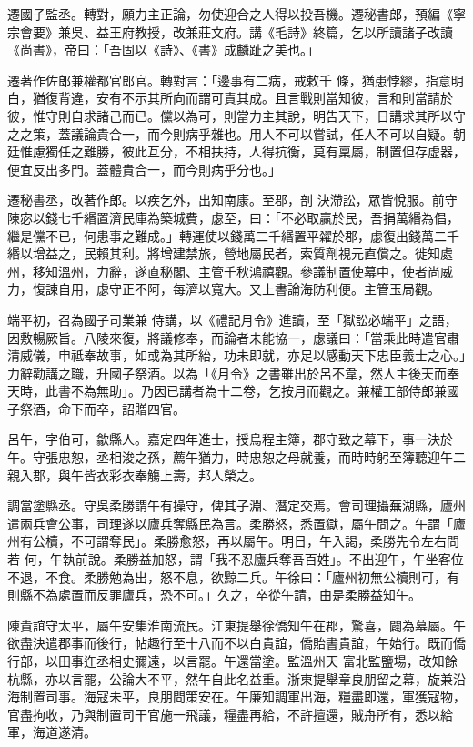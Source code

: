 \begin{pinyinscope}
 遷國子監丞。轉對，願力主正論，勿使迎合之人得以投吾機。遷秘書郎，預編《寧宗會要》兼吳、益王府教授，改兼莊文府。講《毛詩》終篇，乞以所讀諸子改讀《尚書》，帝曰：「吾固以《詩》、《書》成麟趾之美也。」



 遷著作佐郎兼權都官郎官。轉對言：「邊事有二病，戒敕千
 條，猶患悖繆，指意明白，猶復背違，安有不示其所向而謂可責其成。且言戰則當知彼，言和則當請於彼，惟守則自求諸己而已。儻以為可，則當力主其說，明告天下，日講求其所以守之之策，蓋議論貴合一，而今則病乎雜也。用人不可以嘗試，任人不可以自疑。朝廷惟慮獨任之難勝，彼此互分，不相扶持，人得抗衡，莫有稟屬，制置但存虛器，便宜反出多門。蓋體貴合一，而今則病乎分也。」



 遷秘書丞，改著作郎。以疾乞外，出知南康。至郡，剖
 決滯訟，眾皆悅服。前守陳宓以錢七千緡置濟民庫為築城費，虙至，曰：「不必取贏於民，吾捐萬緡為倡，繼是儻不已，何患事之難成。」轉運使以錢萬二千緡置平糴於郡，虙復出錢萬二千緡以增益之，民賴其利。將增建禁旅，營地屬民者，索質劑視元直償之。徙知處州，移知溫州，力辭，遂直秘閣、主管千秋鴻禧觀。參議制置使幕中，使者尚威力，愎諫自用，虙守正不阿，每濟以寬大。又上書論海防利便。主管玉局觀。



 端平初，召為國子司業兼
 侍講，以《禮記月令》進讀，至「獄訟必端平」之語，因敷暢厥旨。八陵來復，將議修奉，而論者未能協一，虙議曰：「當乘此時遣官肅清威儀，申祗奉故事，如或為其所紿，功未即就，亦足以感動天下忠臣義士之心。」力辭勸講之職，升國子祭酒。以為「《月令》之書雖出於呂不韋，然人主後天而奉天時，此書不為無助」。乃因已講者為十二卷，乞按月而觀之。兼權工部侍郎兼國子祭酒，命下而卒，詔贈四官。



 呂午，字伯可，歙縣人。嘉定四年進士，授烏程主簿，郡守致之幕下，事一決於午。守張忠恕，丞相浚之孫，薦午猶力，時忠恕之母就養，而時時躬至簿聽迎午二親入郡，與午皆衣彩衣奉觴上壽，邦人榮之。



 調當塗縣丞。守吳柔勝謂午有操守，俾其子淵、潛定交焉。會司理攝蕪湖縣，廬州遣兩兵會公事，司理遂以廬兵奪縣民為言。柔勝怒，悉置獄，屬午問之。午謂「廬州有公櫝，不可謂奪民」。柔勝愈怒，再以屬午。明日，午入謁，柔勝先令左右問若
 何，午執前說。柔勝益加怒，謂「我不忍廬兵奪吾百姓」。不出迎午，午坐客位不退，不食。柔勝勉為出，怒不息，欲黥二兵。午徐曰：「廬州初無公櫝則可，有則縣不為處置而反罪廬兵，恐不可。」久之，卒從午請，由是柔勝益知午。



 陳貴誼守太平，屬午安集淮南流民。江東提舉徐僑知午在郡，驚喜，闢為幕屬。午欲盡決遣郡事而後行，帖趣行至十八而不以白貴誼，僑貽書貴誼，午始行。既而僑行部，以田事迕丞相史彌遠，以言罷。午還當塗。監溫州天
 富北監鹽場，改知餘杭縣，亦以言罷，公論大不平，然午自此名益重。浙東提舉章良朋留之幕，旋兼沿海制置司事。海寇未平，良朋問策安在。午廉知調軍出海，糧盡即還，軍獲寇物，官盡拘收，乃與制置司干官施一飛議，糧盡再給，不許擅還，賊舟所有，悉以給軍，海道遂清。




\end{pinyinscope}

